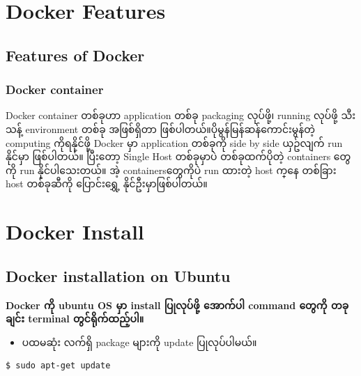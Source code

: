 \pagebreak

\hypertarget{docker-features}{%
\section{Docker Features}\label{docker-features}}

\hypertarget{features-of-docker}{%
\subsection{Features of Docker}\label{features-of-docker}}

\hypertarget{docker-container}{%
\subsubsection{Docker container}\label{docker-container}}

Docker container တစ်ခုဟာ application တစ်ခု packaging လုပ်ဖို့၊ running
လုပ်ဖို့ သီးသန့် environment တစ်ခု အဖြစ်​ရှိ​တာ
ဖြစ်ပါတယ်။ပိုမွန်​မြန်ဆန်​ကောင်းမွန်တဲ့ computing ကိုရနိုင်ဖို့ Docker
မှာ application တစ်ခုကို side by side ယှဥ်လျက် run နိုင်မှာ ဖြစ်ပါတယ်။
ပြီး​တော့ Single Host တစ်ခုမှာပဲ တစ်ခုထက်ပိုတဲ့ containers ​တွေကို run
နိုင်ပါ​သေးတယ်။ အဲ့ containers ​တွေကိုပဲ run ထားတဲ့ host က္​နေ တစ်ခြား
host တစ်ခုဆီကို ​ပြောင်း​​ရွှေ့ နိုင်ဦးမှာဖြစ်ပါတယ်။

\pagebreak

\hypertarget{docker-install}{%
\section{Docker Install}\label{docker-install}}

\hypertarget{docker-installation-on-ubuntu}{%
\subsection{Docker installation on
Ubuntu}\label{docker-installation-on-ubuntu}}

\textbf{Docker ကို ubuntu OS မှာ install ပြုလုပ်ဖို့ အောက်ပါ command
တွေကို တခုချင်း terminal တွင်ရိုက်ထည့်ပါ။}

\begin{itemize}
\tightlist
\item
  ပထမဆုံး လက်ရှိ package များကို update ပြုလုပ်ပါမယ်။
\end{itemize}

\begin{verbatim}
$ sudo apt-get update
\end{verbatim}

